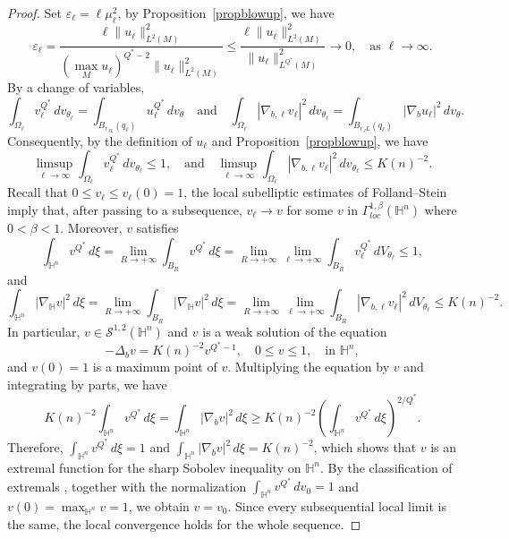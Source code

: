 \documentclass[11pt]{article}
\numberwithin{equation}{section}
\newcommand{\Ha}{\mathbb{H}^n}
\numberwithin{equation}{section}
\begin{document}
	\begin{proof}
		Set \(\varepsilon_\ell =  \ell \mu_\ell^2\), by Proposition~\ref{propblowup}, we have
		\[
		\varepsilon_\ell = \frac{\ell \| u_\ell \|_{L^2(M)}^2}{(\max_M u_\ell)^{Q^*-2}\| u_\ell \|_{L^2(M)}^2} \le \frac{\ell \| u_\ell \|_{L^2(M)}^2}{\| u_\ell \|_{L^{Q^*}(M)}^2} \rightarrow 0, \quad \text{as } \ell \to \infty.
		\]
		By a change of variables,
		\[
		\int_{\Omega_\ell}v_\ell^{Q^*}\,dv_{\theta_\ell}= \int_{B_{r_{JL}}(q_\ell)}u_\ell^{Q^*}\,dv_\theta \quad \text{and}\quad \int_{\Omega_\ell}|\nabla_{b,\ell}v_\ell| ^2\,dv_{\theta_\ell}=\int_{B_{r_JL}(q_\ell)}|\nabla_bu_\ell|^2\,dv_\theta.
		\]
		Consequently, by the definition of \(u_\ell\) and Proposition~\ref{propblowup}, we have
		\begin{equation}\label{equlimsupvl}
			\limsup_{\ell\to\infty}\int_{\Omega_\ell}v_\ell^{Q^*}\,dv_{\theta_\ell} \le 1, \quad \text{and}\quad \limsup_{\ell\to\infty}\int_{\Omega_\ell}|\nabla_{b,\ell}v_\ell|^2\,dv_{\theta_\ell} \le K(n)^{-2}.
		\end{equation}
		Recall that \(0 \le v_\ell \le v_\ell(0) =1\), the local subelliptic estimates of Folland--Stein \cite{FS1974} imply that, after passing to a subsequence, \(v_\ell \rightarrow v\) for some \(v\) in \(\Gamma^{1, \beta}_{loc}(\Ha)\) where \(0 < \beta <1\). Moreover, \(v\) satisfies
		\[
		\int_{\Ha} v^{Q^*}\,d \xi = \lim_{R \to +\infty}  \int_{B_R} v^{Q^*}\,d \xi = \lim_{R \to +\infty} \lim_{\ell \to +\infty} \int_{B_R} v_\ell^{Q^*}\,d V_{\theta_\ell} \le 1,
		\]
		and
		\[
		\int_{\Ha}|\nabla_{\mathbb{H}} v|^2\,d \xi = \lim_{R \to +\infty} \int_{B_R}|\nabla_{\mathbb{H}} v|^2\,d \xi= \lim_{R \to +\infty} \lim_{\ell \to +\infty} \int_{B_R}|\nabla_{b, \ell} v_\ell|^2\,d V_{\theta_\ell} \le K(n)^{-2}.
		\]
		In particular, \(v \in \mathcal{S}^{1, 2}(\Ha)\) and \(v\) is a weak solution of the equation
		\[
		-\Delta_b v = K(n)^{-2} v^{Q^*-1}, \quad 0 \le v \le 1, \quad \text{in } \Ha,
		\]
		and \(v(0) =1\) is a maximum point of \(v\). Multiplying the equation by \(v\) and integrating by parts, we have
		\[
		K(n)^{-2} \int_{\Ha} v^{Q^*}\,d \xi = \int_{\Ha}|\nabla_b v|^2\,d \xi \ge K(n)^{-2} (\int_{\Ha} v^{Q^*}\,d \xi)^{2/Q^*}.
		\]
		Therefore, \(\int_{\Ha} v^{Q^*}\,d \xi = 1\) and \(\int_{\Ha}|\nabla_b v|^2\,d \xi = K(n)^{-2}\), which shows that \(v\) is an extremal function for the sharp Sobolev inequality on \(\mathbb{H}^n\). By the classification of extremals \cite{JL1988,FL2012}, together with the normalization \(\int_{\mathbb H^n}v^{Q^*}\,dv_0=1\) and \(v(0)=\max_{\mathbb H^n}v=1\), we obtain \(v=v_0\). Since every subsequential local limit is the same, the local convergence holds for the whole sequence.
		

\end{proof}
\end{document}
